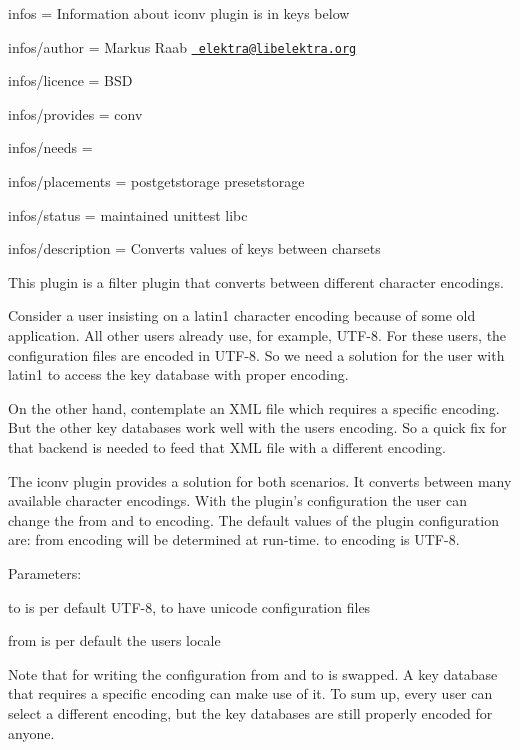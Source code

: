 
\begin{DoxyItemize}
\item infos = Information about iconv plugin is in keys below
\item infos/author = Markus Raab \href{mailto:elektra@libelektra.org}{\texttt{ elektra@libelektra.\+org}}
\item infos/licence = B\+SD
\item infos/provides = conv
\item infos/needs =
\item infos/placements = postgetstorage presetstorage
\item infos/status = maintained unittest libc
\item infos/description = Converts values of keys between charsets
\end{DoxyItemize}

This plugin is a filter plugin that converts between different character encodings.

Consider a user insisting on a {\ttfamily latin1} character encoding because of some old application. All other users already use, for example, {\ttfamily U\+T\+F-\/8}. For these users, the configuration files are encoded in {\ttfamily U\+T\+F-\/8}. So we need a solution for the user with {\ttfamily latin1} to access the key database with proper encoding.

On the other hand, contemplate an X\+ML file which requires a specific encoding. But the other key databases work well with the users encoding. So a quick fix for that backend is needed to feed that X\+ML file with a different encoding.

The iconv plugin provides a solution for both scenarios. It converts between many available character encodings. With the plugin’s configuration the user can change the from and to encoding. The default values of the plugin configuration are\+: {\ttfamily from} encoding will be determined at run-\/time. {\ttfamily to} encoding is {\ttfamily U\+T\+F-\/8}.

Parameters\+:


\begin{DoxyItemize}
\item {\ttfamily to} is per default U\+T\+F-\/8, to have unicode configuration files
\item {\ttfamily from} is per default the users locale
\end{DoxyItemize}

Note that for writing the configuration {\ttfamily from} and {\ttfamily to} is swapped. A key database that requires a specific encoding can make use of it. To sum up, every user can select a different encoding, but the key databases are still properly encoded for anyone.

